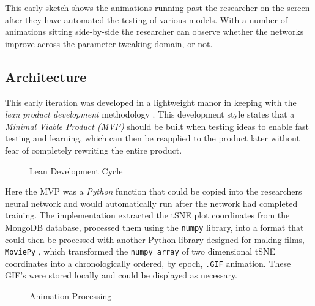 \documentclass[a4paper,11pt,titlepage]{article}
\begin{document}
	This early sketch shows the animations running past the researcher on the screen after they have automated the testing of various models. With a number of animations sitting side-by-side the researcher can observe whether the networks improve across the parameter tweaking domain, or not.
	
	\subsection{Architecture}
	This early iteration was developed in a lightweight manor in keeping with the \textit{lean product development} methodology \cite{}. This development style states that a \textit{Minimal Viable Product (MVP)} should be built when testing ideas to enable fast testing and learning, which can then be reapplied to the product later without fear of completely rewriting the entire product.
	\par 
		
	\begin{figure}[H]
    			\caption{Lean Development Cycle}%
	\end{figure}	
	
	Here the MVP was a \textit{Python} function that could be copied into the researchers neural network and would automatically run after the network had completed training. The implementation extracted the tSNE plot coordinates from the MongoDB database, processed them using the \texttt{numpy} library, into a format that could then be processed with another Python library designed for making films, \texttt{MoviePy} \cite{}, which transformed the \texttt{numpy array} of two dimensional tSNE coordinates into a chronologically ordered, by epoch, \texttt{.GIF} animation. These GIF's were stored locally and could be displayed as necessary.
	
	\begin{figure}[H]
    			\caption{Animation Processing}%
	\end{figure}		
\end{document}
